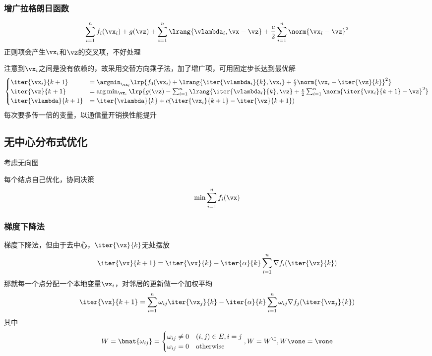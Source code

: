 \subsubsection{增广拉格朗日函数}
\[\sum_{i=1}^nf_i(\vx_i)+g(\vz)+\sum_{i=1}^n\lrang{\vlambda_i,\vx-\vz}+\frac{c}{2}\sum_{i=1}^n\norm{\vx_i-\vz}^2\]
正则项会产生$\vx_i$和$\vz$的交叉项，不好处理

注意到$\vx_i$之间是没有依赖的，故采用交替方向乘子法，加了增广项，可用固定步长达到最优解
\[\begin{cases}
    \iter{\vx_i}{k+1}&=\argmin_{\vx_i} \lrp{f_0(\vx_i)+\lrang{\iter{\vlambda_i}{k},\vx_i}+\frac{c}{2}\norm{\vx_i-\iter{\vz}{k}}^2}\\
    \iter{\vz}{k+1}&=\arg\min_{\vz_i} \lrp{g(\vz)-\sum_{i=1}^n\lrang{\iter{\vlambda_i}{k},\vz}+\frac{c}{2}\sum_{i=1}^n\norm{\iter{\vx_i}{k+1}-\vz}^2}\\
    \iter{\vlambda}{k+1}&=\iter{\vlambda}{k}+c(\iter{\vx_i}{k+1}-\iter{\vz}{k+1})
\end{cases}\]
每次要多传一倍的变量，以通信量开销换性能提升

\subsection{无中心分布式优化}
\par 考虑无向图
\begin{center}
\end{center}
每个结点自己优化，协同决策
\[\min\sum_{i=1}^n f_i(\vx)\]

\subsubsection{梯度下降法}
梯度下降法，但由于去中心，$\iter{\vx}{k}$无处摆放
\[\iter{\vx}{k+1}=\iter{\vx}{k}-\iter{\alpha}{k}\sum_{i=1}^n\nabla f_i(\iter{\vx}{k})\]
那就每一个点分配一个本地变量$\vx_i$，对邻居的更新做一个加权平均
\[\iter{\vx}{k+1}=\sum_{i=1}^n\omega_{ij}\iter{\vx_j}{k}-\iter{\alpha}{k}\sum_{i=1}^n\omega_{ij}\nabla f_j(\iter{\vx_j}{k})\]
其中
\[W=\bmat{\omega_{ij}}=\begin{cases}
    \omega_{ij}\ne 0 & (i,j)\in E, i=j\\
    \omega_{ij}=0 & \text{otherwise}
\end{cases}
,W=W^\T,W\vone=\vone\]

